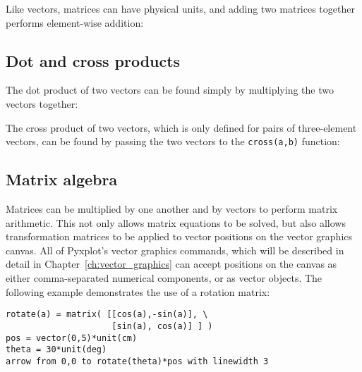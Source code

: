 \vspace{3mm}

\vspace{3mm}

Like vectors, matrices can have physical units, and adding two matrices together performs element-wise addition:

\vspace{3mm}

\vspace{3mm}

\subsection{Dot and cross products}

The dot product of two vectors can be found simply by multiplying the two vectors together:

\vspace{3mm}

\vspace{3mm}

\noindent
The cross product of two vectors, which is only defined for pairs of three-element vectors, can be found by passing the two vectors to the {\tt cross(a,b)} function:

\vspace{3mm}

\vspace{3mm}


\subsection{Matrix algebra}

Matrices can be multiplied by one another and by vectors to perform matrix
arithmetic. This not only allows matrix equations to be solved, but also allows
transformation matrices to be applied to vector positions on the vector
graphics canvas. All of Pyxplot's vector graphics commands, which will be
described in detail in Chapter~\ref{ch:vector_graphics} can accept positions on
the canvas as either comma-separated numerical components, or as vector
objects. The following example demonstrates the use of a rotation matrix:

\begin{verbatim}
rotate(a) = matrix( [[cos(a),-sin(a)], \
                     [sin(a), cos(a)] ] )
pos = vector(0,5)*unit(cm)
theta = 30*unit(deg)
arrow from 0,0 to rotate(theta)*pos with linewidth 3
\end{verbatim}


